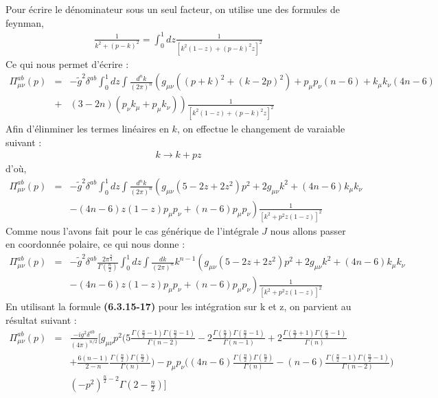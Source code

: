 \documentclass[a4paper,11pt]{article} %
\theoremstyle{plain}
\theoremstyle{definition}
\theoremstyle{remark}
\numberwithin{equation}{section}
\numberwithin{equation}{subsection}
\numberwithin{figure}{section}
\begin{document}
\noindent
Pour écrire le dénominateur sous un seul facteur, on utilise une des formules de feynman,
\begin{eqnarray*}
 \frac{1}{k^2+(p-k)^2} = \int_0^{1} dz \frac{1}{\left[k^2(1-z)+(p-k)^2z\right]^2}
\end{eqnarray*} 
Ce qui nous permet d'écrire :
\begin{eqnarray*}
 \Pi^{ab}_{\mu\nu}(p) &=&  -\tilde{g}^{2}  \delta^{ab} \int_0^{1} dz \int \frac{d^{n}k}{\left(2\pi\right)^n} 
\left( g_{\mu\nu}\left((p+k)^{2} +(k-2p)^2\right) + p_{\mu}p_{\nu}\left(n-6\right)+k_{\mu}k_{\nu}\left(4n-6\right)\right.\nonumber    \\
&+& \left. (3-2n)(p_{\nu}k_{\mu}+p_{\mu}k_{\nu}) \right) \frac{1}{\left[k^2(1-z)+(p-k)^2z\right]^2}
\end{eqnarray*}
Afin d'élinminer les termes linéaires en $k$, on effectue le changement de varaiable suivant :
\begin{eqnarray*}
 k \rightarrow k+pz
\end{eqnarray*}
d'où,
\begin{eqnarray*}
 \Pi^{ab}_{\mu\nu}(p) &=&  -\tilde{g}^{2}  \delta^{ab} \int_0^{1} dz \int \frac{d^{n}k}{\left(2\pi\right)^n} 
\left(g_{\mu\nu} (5-2z+2z^2)p^2 + 2g_{\mu\nu}k^2 + (4n-6)k_{\mu}k_{\nu}\right. \nonumber  \\
&& \left. -(4n-6)z(1-z)p_{\mu}p_{\nu} +(n-6)p_{\mu}p_{\nu}  \right)
\frac{1}{\left[k^2 + p^2 z (1-z) \right]^2} 
\end{eqnarray*}
Comme nous l'avons fait pour le cas générique de l'intégrale $J$ nous allons passer en coordonnée polaire, ce qui nous donne :
\begin{eqnarray*}
 \Pi^{ab}_{\mu\nu}(p) &=&  -\tilde{g}^{2}  \delta^{ab}  \frac{2 \pi^{\frac{n}{2}}}{\Gamma(\frac{n}{2})}  \int_0^{1} dz 
\int \frac{dk}{\left(2\pi\right)^n} k^{n-1}
\left(g_{\mu\nu} (5-2z+2z^2)p^2 + 2g_{\mu\nu}k^2 + (4n-6)k_{\mu}k_{\nu}\right. \nonumber  \\
&& \left. -(4n-6)z(1-z)p_{\mu}p_{\nu} +(n-6)p_{\mu}p_{\nu}  \right)
\frac{1}{\left[k^2 + p^2 z (1-z) \right]^2} 
\end{eqnarray*}
En utilisant la formule \textbf{(6.3.15-17)} pour les intégration sur k et z, on parvient au résultat suivant :
\begin{eqnarray*}
\Pi^{ab}_{\mu\nu}(p) &=& \frac{-i g^2 \delta^{ab}}{\left(4\pi\right)^{n/2}}   \Bigg[  
g_{\mu\nu}p^2  \bigg(
5\frac{\Gamma(\frac{n}{2}-1)\Gamma(\frac{n}{2}-1)}{\Gamma(n-2)} 
-2\frac{\Gamma(\frac{n}{2})\Gamma(\frac{n}{2}-1)}{\Gamma(n-1)}
+2\frac{\Gamma(\frac{n}{2}+1)\Gamma(\frac{n}{2}-1)}{\Gamma(n)}       \nonumber   \\ 
&& +\frac{6(n-1)}{2-n}\frac{\Gamma(\frac{n}{2})\Gamma(\frac{n}{2})}{\Gamma(n)} \bigg)
-p_{\mu}p_{\nu}
\bigg((4n-6)\frac{\Gamma(\frac{n}{2})\Gamma(\frac{n}{2})}{\Gamma(n)}
-(n-6)\frac{\Gamma(\frac{n}{2}-1)\Gamma(\frac{n}{2}-1)}{\Gamma(n-2)}  \bigg)  \nonumber  \\
&& (-p^2)^{\frac{n}{2}-2}\Gamma(2-\frac{n}{2})   \Bigg]
\end{eqnarray*}
\end{document}
